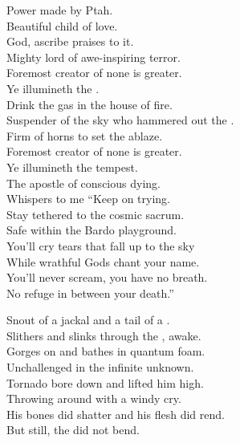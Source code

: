 
Power made by Ptah. \\
Beautiful child of love. \\
God, ascribe praises to it. \\
Mighty lord of awe-inspiring terror. \\
Foremost creator of none is greater. \\
Ye illumineth the . \\

Drink the gas in the house of fire. \\
Suspender of the sky who hammered out the . \\
Firm of horns to set the  ablaze. \\
Foremost creator of none is greater. \\
Ye illumineth the tempest. \\

The apostle of conscious dying. \\
Whispers to me ``Keep on trying. \\
Stay tethered to the cosmic sacrum. \\
Safe within the Bardo playground. \\
You'll cry tears that fall up to the sky \\
While wrathful Gods chant your name. \\
You'll never scream, you have no breath. \\
No refuge in between your death.'' \\




Snout of a jackal and a tail of a . \\
Slithers and slinks through the , awake. \\
Gorges on  and bathes in quantum foam. \\
Unchallenged in the infinite unknown. \\

Tornado bore down and lifted him high. \\
Throwing  around with a windy cry. \\
His bones did shatter and his flesh did rend. \\
But still, the  did not bend. \\

